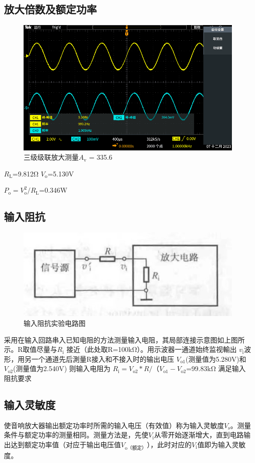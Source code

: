 \documentclass[a4paper,11pt,UTF8]{article}
\numberwithin{equation}{subsection}
\begin{document}
\subsection{放大倍数及额定功率}
	\begin{figure}[h]
		\centering
		\includegraphics[width=0.8\linewidth]{TEK00020.PNG}
		\caption{三级级联放大测量$A_\mathrm{v}$ = 335.6}
	\end{figure}
$R_\mathrm{L}$=9.812Ω  $V_\mathrm{o}$=5.130V 

$P_\mathrm{o}=V_\mathrm{o}^{2}/	R_\mathrm{L}$={0.346W}

\subsection{输入阻抗}
\begin{figure}[!ht ]
		\centering
		\includegraphics[width=0.8\linewidth]{2.jpg}
		\caption{输入阻抗实验电路图}
\end{figure}
采用在输入回路串入已知电阻的方法测量输入电阻，其局部连接示意图如上图所示。R取值尽量与$R_\mathrm{i}$ 接近（此处取R={100kΩ}）。用示波器一通道始终监视輸出	$v_\mathrm{i}$波形，用另一个通道先后測量R接入和不接入时的输出电压	$V_\mathrm{o1}$(测量值为{5.280V})和$V_\mathrm{o2}$(测量值为{2.540V})
则输入电阻为
$R_\mathrm{i} =V_\mathrm{o2}*R/（V_\mathrm{o1}-V_\mathrm{o2}$={99.83kΩ}  满足输入阻抗要求
\subsection{输入灵敏度}
使音响放大器输出额定功率时所需的输入电压（有效值）称为输入灵敏度$V_\mathrm{s}$。测量条件与额定功率的测量相同。测量方法是，先使$V_\mathrm{i}$从零开始逐渐增大，直到电路输出达到额定功率值（对应于输出电压值$V_\mathrm{o（额定）}$），此时对应的$V_\mathrm{i}$值即为输入灵敏度。
\end{document}
